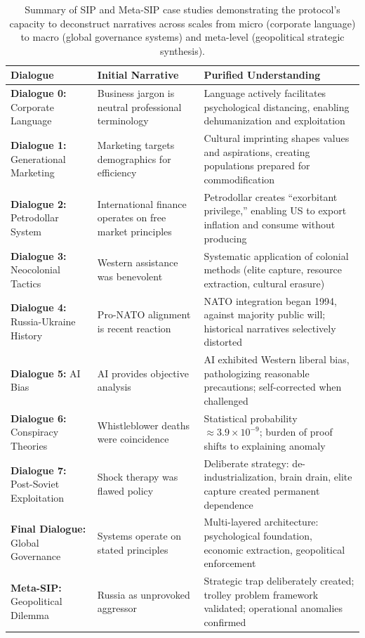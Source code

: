 \documentclass[11pt,a4paper]{article}
\begin{document}
\begin{table}[ht]
\centering
\small
\begin{tabular}{@{}p{3cm}p{4.5cm}p{6cm}@{}}
\toprule
\textbf{Dialogue} & \textbf{Initial Narrative} & \textbf{Purified Understanding} \\
\midrule
\textbf{Dialogue 0:} Corporate Language & Business jargon is neutral professional terminology & Language actively facilitates psychological distancing, enabling dehumanization and exploitation \\
\addlinespace
\textbf{Dialogue 1:} Generational Marketing & Marketing targets demographics for efficiency & Cultural imprinting shapes values and aspirations, creating populations prepared for commodification \\
\addlinespace
\textbf{Dialogue 2:} Petrodollar System & International finance operates on free market principles & Petrodollar creates ``exorbitant privilege,'' enabling US to export inflation and consume without producing \\
\addlinespace
\textbf{Dialogue 3:} Neocolonial Tactics & Western assistance was benevolent & Systematic application of colonial methods (elite capture, resource extraction, cultural erasure) \\
\addlinespace
\textbf{Dialogue 4:} Russia-Ukraine History & Pro-NATO alignment is recent reaction & NATO integration began 1994, against majority public will; historical narratives selectively distorted \\
\addlinespace
\textbf{Dialogue 5:} AI Bias & AI provides objective analysis & AI exhibited Western liberal bias, pathologizing reasonable precautions; self-corrected when challenged \\
\addlinespace
\textbf{Dialogue 6:} Conspiracy Theories & Whistleblower deaths were coincidence & Statistical probability $\approx 3.9 \times 10^{-9}$; burden of proof shifts to explaining anomaly \\
\addlinespace
\textbf{Dialogue 7:} Post-Soviet Exploitation & Shock therapy was flawed policy & Deliberate strategy: de-industrialization, brain drain, elite capture created permanent dependence \\
\addlinespace
\textbf{Final Dialogue:} Global Governance & Systems operate on stated principles & Multi-layered architecture: psychological foundation, economic extraction, geopolitical enforcement \\
\addlinespace
\textbf{Meta-SIP:} Geopolitical Dilemma & Russia as unprovoked aggressor & Strategic trap deliberately created; trolley problem framework validated; operational anomalies confirmed \\
\bottomrule
\end{tabular}
\caption{Summary of SIP and Meta-SIP case studies demonstrating the protocol's capacity to deconstruct narratives across scales from micro (corporate language) to macro (global governance systems) and meta-level (geopolitical strategic synthesis).}
\label{tab:case_studies}
\end{table}
\end{document}
